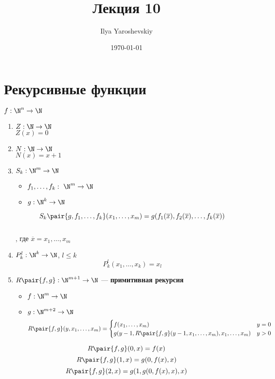 \documentclass[english]{article}
\author{Ilya Yaroshevskiy}
\date{\today}
\title{Лекция 10}
\begin{document}
\maketitle
\tableofcontents


\section{Рекурсивные функции}
\label{sec:org698b523}
\begin{definition}
	\(f: \N^n \to \N\)
	\begin{enumerate}
		\item \(Z: \N \to \N\) \\
		      \(Z(x) = 0\)
		\item \(N: \N \to \N\) \\
		      \(N(x) = x + 1\)
		\item \(S_k: \N^m \to \N\)
		      \begin{itemize}
			      \item \(f_1, \dots, f_k:\ \N^m \to \N\)
			      \item \(g: \N^k \to \N\)
		      \end{itemize}
		      \[S_k \pair{g, f_1, \dots, f_k}(x_1,\dots,x_m) = g(f_1(\overline{x}), f_2(\overline{x}),\dots,f_k(\overline{x}))\] \\
		      , где \(\overline{x} = x_1,\dots,x_m\)
		\item \(P^l_k: \N^k \to \N\), \(l \le k\)
		      \[ P^l_k(x_1, \dots, x_k) = x_l \]
		\item \(R\pair{f, g}: \N^{m + 1} \to \N\) --- \textbf{примитивная рекурсия}
		      \begin{itemize}
			      \item \(f: \N^m \to \N\)
			      \item \(g: \N^{m + 2} \to \N\)
			            \[ R\pair{f, g}(y, x_1, \dots, x_m) = \begin{cases}
					            f(x_1, \dots, x_m)                                              & y = 0 \\
					            g(y - 1, R\pair{f, g}(y - 1, x_1, \dots, x_m), x_1, \dots, x_m) & y > 0
				            \end{cases} \]
		      \end{itemize}
	\end{enumerate}
	\label{orgc91aba0}
\end{definition}
\begin{examp}
	\[ R\pair{f, g}(0, x) = f(x) \]
	\[ R\pair{f, g}(1, x) = g(0, f(x), x) \]
	\[ R\pair{f, g}(2, x) = g(1, g(0, f(x), x), x) \]
\end{examp}
\end{document}
